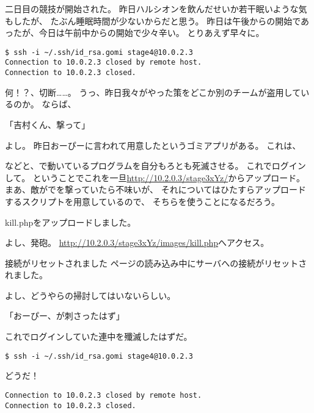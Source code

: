 二日目の競技が開始された。
昨日ハルシオンを飲んだせいか若干眠いような気もしたが、
たぶん睡眠時間が少ないからだと思う。
昨日は午後からの開始であったが、今日は午前中からの開始で少々辛い。
とりあえず早々に。

\begin{lstlisting}
$ ssh -i ~/.ssh/id_rsa.gomi stage4@10.0.2.3
Connection to 10.0.2.3 closed by remote host.
Connection to 10.0.2.3 closed.
\end{lstlisting}

何！？、切断……。
うっ、昨日我々がやった策をどこか別のチームが盗用しているのか。
ならば、

「吉村くん、撃って」

よし。
昨日おーぴーに言われて用意したというゴミアプリがある。
これは、



などと、で動いているプログラムを自分もろとも死滅させる。
これでログインして。
ということでこれを一旦\url{http://10.2.0.3/stage3xYz/}からアップロード。
まあ、敵がでを撃っていたら不味いが、
それについてはひたすらアップロードするスクリプトを用意しているので、
そちらを使うことになるだろう。

\begin{screen}
\centering
kill.phpをアップロードしました。
\end{screen}

よし、発砲。
\url{http://10.2.0.3/stage3xYz/images/kill.php}へアクセス。

\begin{itembox}[c]{接続がリセットされました}
ページの読み込み中にサーバへの接続がリセットされました。
\end{itembox}

よし、どうやらの掃討してはいないらしい。

「おーぴー、が刺さったはず」

これでログインしていた連中を殲滅したはずだ。

\begin{lstlisting}
$ ssh -i ~/.ssh/id_rsa.gomi stage4@10.0.2.3
\end{lstlisting}

どうだ！

\begin{lstlisting}
Connection to 10.0.2.3 closed by remote host.
Connection to 10.0.2.3 closed.
\end{lstlisting}

